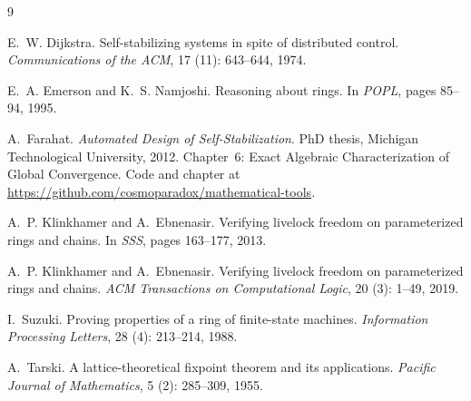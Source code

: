 \documentclass{article}
\begin{document}

\begin{thebibliography}{9}

E.~W. Dijkstra.
\newblock Self-stabilizing systems in spite of distributed control.
\newblock \emph{Communications of the ACM}, 17 (11):
  643--644, 1974.

E.~A. Emerson and K.~S. Namjoshi.
\newblock Reasoning about rings.
\newblock In \emph{POPL}, pages 85--94, 1995.

A.~Farahat.
\newblock \emph{Automated Design of Self-Stabilization}.
\newblock PhD thesis, Michigan Technological University, 2012.
\newblock Chapter~6: Exact Algebraic Characterization of Global Convergence.
  Code and chapter at
  \url{https://github.com/cosmoparadox/mathematical-tools}.

A.~P. Klinkhamer and A.~Ebnenasir.
\newblock Verifying livelock freedom on parameterized rings and chains.
\newblock In \emph{SSS}, pages 163--177, 2013.

A.~P. Klinkhamer and A.~Ebnenasir.
\newblock Verifying livelock freedom on parameterized rings and chains.
\newblock \emph{ACM Transactions on Computational Logic}, 20
  (3): 1--49, 2019.

I.~Suzuki.
\newblock Proving properties of a ring of finite-state machines.
\newblock \emph{Information Processing Letters}, 28 (4):
  213--214, 1988.

A.~Tarski.
\newblock A lattice-theoretical fixpoint theorem and its applications.
\newblock \emph{Pacific Journal of Mathematics}, 5 (2):
  285--309, 1955.

\end{thebibliography}
\end{document}
